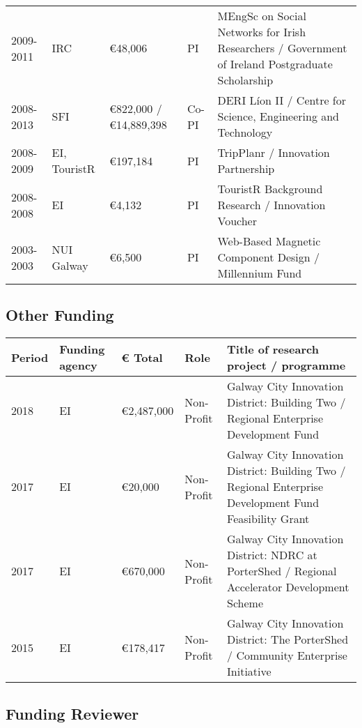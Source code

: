 \documentclass[10pt,a4paper]{res} %
\begin{document}
\begin{resume}
\begin{longtable}{ p{2 cm} | p{2 cm} | p{2 cm} | p{2 cm} | p{7 cm} }
2009-2011 & IRC & \euro{}48,006 & PI & MEngSc on Social Networks for Irish Researchers / Government of Ireland Postgraduate Scholarship \\
2008-2013 & SFI & \euro{}822,000 / \euro{}14,889,398 & Co-PI & DERI L\'{i}on II / Centre for Science, Engineering and Technology \\
2008-2009 & EI, TouristR & \euro{}197,184 & PI & TripPlanr / Innovation Partnership \\
2008-2008 & EI & \euro{}4,132 & PI & TouristR Background Research / Innovation Voucher \\
2003-2003 & NUI Galway & \euro{}6,500 & PI & Web-Based Magnetic Component Design / Millennium Fund \\
\end{longtable}

\subsection*{Other Funding}

\begin{tabular}{ p{2 cm} | p{2 cm} | p{2 cm} | p{2 cm} | p{7 cm} }
Period & Funding agency & \euro{} Total & Role & Title of research project / programme \\
\hline
2018 & EI & \euro{}2,487,000 & Non-Profit & Galway City Innovation District: Building Two / Regional Enterprise Development Fund \\
2017 & EI & \euro{}20,000 & Non-Profit & Galway City Innovation District: Building Two / Regional Enterprise Development Fund Feasibility Grant \\
2017 & EI & \euro{}670,000 & Non-Profit & Galway City Innovation District: NDRC at PorterShed / Regional Accelerator Development Scheme \\
2015 & EI & \euro{}178,417 & Non-Profit & Galway City Innovation District: The PorterShed / Community Enterprise Initiative \\
\end{tabular}

\subsection*{Funding Reviewer}


\end{resume}
\end{document}
